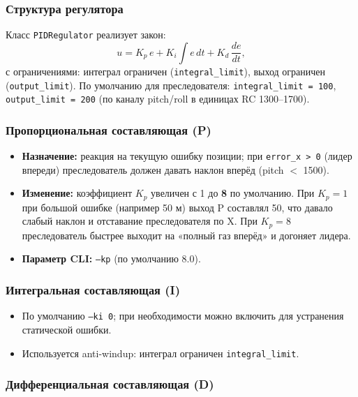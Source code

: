 \documentclass[12pt,a4paper]{article}
\begin{document}
\subsubsection{Структура регулятора}

Класс \texttt{PIDRegulator} реализует закон:
\begin{equation}
  u = K_p\, e + K_i \int e\, dt + K_d\, \frac{de}{dt},
\end{equation}
с ограничениями: интеграл ограничен (\texttt{integral\_limit}), выход ограничен (\texttt{output\_limit}). По умолчанию для преследователя: \texttt{integral\_limit = 100}, \texttt{output\_limit = 200} (по каналу pitch/roll в единицах RC 1300--1700).

\subsubsection{Пропорциональная составляющая (P)}

\begin{itemize}[noitemsep]
  \item \textbf{Назначение:} реакция на текущую ошибку позиции; при \texttt{error\_x > 0} (лидер впереди) преследователь должен давать наклон вперёд (pitch $<$ 1500).
  \item \textbf{Изменение:} коэффициент $K_p$ увеличен с 1 до \textbf{8} по умолчанию. При $K_p = 1$ при большой ошибке (например 50 м) выход P составлял 50, что давало слабый наклон и отставание преследователя по X. При $K_p = 8$ преследователь быстрее выходит на «полный газ вперёд» и догоняет лидера.
  \item \textbf{Параметр CLI:} \texttt{--kp} (по умолчанию 8.0).
\end{itemize}

\subsubsection{Интегральная составляющая (I)}

\begin{itemize}[noitemsep]
  \item По умолчанию \texttt{--ki 0}; при необходимости можно включить для устранения статической ошибки.
  \item Используется anti-windup: интеграл ограничен \texttt{integral\_limit}.
\end{itemize}

\subsubsection{Дифференциальная составляющая (D)}
\end{document}
